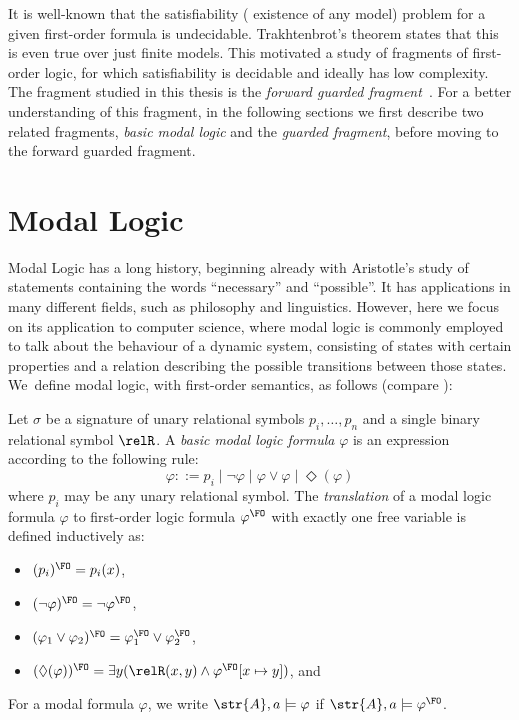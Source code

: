 It is well-known that the satisfiability (\ie{} existence of any model) problem for a given first-order formula is undecidable\cite[Sec. 1.1]{borger1997}.
Trakhtenbrot's theorem states that this is even true over just finite models\cite{trakhtenbrot50}.
This motivated a study of fragments of first-order logic, for which satisfiability is decidable and ideally has low complexity.
The fragment studied in this thesis is the \emph{forward guarded fragment}~\cite[Sec. 3.1]{Bednarczyk21}.
For a better understanding of this fragment, in the following sections we first describe two related fragments, \emph{basic modal logic} and the \emph{guarded fragment}, before moving to the forward guarded fragment.

\section{Modal Logic}
Modal Logic has a long history, beginning already with Aristotle's study of statements containing the words ``necessary'' and ``possible''\cite{goldblatt2006}.
It has applications in many different fields, such as philosophy and linguistics\cite{vanBenthem2010-VANMLF-4}.
However, here we focus on its application to computer science, where modal logic is commonly employed to talk about the behaviour of a dynamic system, consisting of states with certain properties and a relation describing the possible transitions between those states.
We~define modal logic, with first-order semantics, as follows (compare \cite[Sec. 2.1.2]{otto2004a}):
\begin{definition}
  Let $\sigma$ be a signature of unary relational symbols $p_{i}, \ldots, p_{n}$ and a single binary relational symbol $\relR$.
  A \emph{basic modal logic formula} $\varphi$ is an expression according to the following rule:
  \begin{equation*}
    \varphi ::= p_{i}
      \mid \neg \varphi
      \mid \varphi \lor \varphi
      \mid \Diamond(\varphi)
  \end{equation*}
  where $p_{i}$ may be any unary relational symbol.
  The \emph{translation} of a modal logic formula $\varphi$ to first-order logic formula $\varphi^{\FO}$ with exactly one free variable is defined inductively as:
  \begin{itemize}
    \item $(p_{i})^{\FO} = p_{i}(x)$,
    \item $(\neg \varphi)^{\FO} = \neg \varphi^{\FO}$,
    \item $(\varphi_{1} \lor \varphi_{2})^{\FO} = \varphi_{1}^{\FO} \lor \varphi_{2}^{\FO}$,
    \item $(\Diamond (\varphi))^{\FO} = \exists{y}(\relR(x,y) \land \varphi^{\FO}[x \mapsto y])$, and
  \end{itemize}
  For a modal formula $\varphi$, we write $\str{A}, a \models \varphi$ if $\str{A}, a \models \varphi^{\FO}$.
\end{definition}
